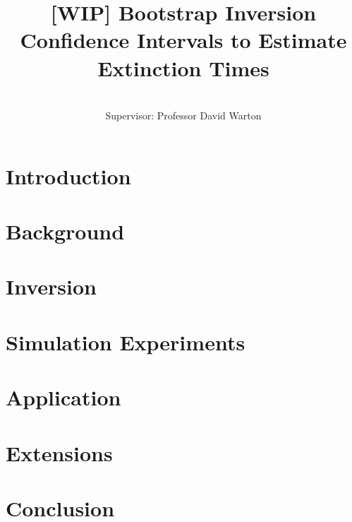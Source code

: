 \documentclass[honours,12pt]{UNSWthesis}
\title{[WIP] Bootstrap Inversion Confidence Intervals to Estimate Extinction Times}
\author{\Authornameonly\\{\bigskip}Supervisor: Professor David Warton}
\begin{document}
%
%

\beforepreface

\afterpage{\blankpage}







\afterpreface

\afterpage{\blankpage}

%
%

\chapter{Introduction}\label{chap: intro}


\chapter{Background}\label{chap: background}


\chapter{Inversion}\label{chap: inversion}


\chapter{Simulation Experiments}\label{chap: experiments}


\chapter{Application}\label{chap: application}


\chapter{Extensions}\label{chap: extensions}


\chapter{Conclusion}\label{chap: conclusion}

\end{document}
